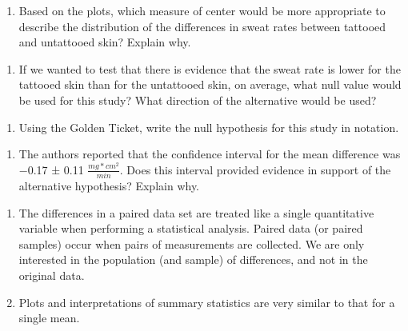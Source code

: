 \documentclass[
]{report}
\providecommand{\tightlist}{%
  \setlength{\itemsep}{0pt}\setlength{\parskip}{0pt}}
\begin{document}
\vspace{0.2in}

\begin{enumerate}
\def\labelenumi{\arabic{enumi}.}
\setcounter{enumi}{14}
\tightlist
\item
  Based on the plots, which measure of center would be more appropriate to describe the distribution of the differences in sweat rates between tattooed and untattooed skin? Explain why.
\end{enumerate}

\vspace{0.5in}

\begin{enumerate}
\def\labelenumi{\arabic{enumi}.}
\setcounter{enumi}{15}
\tightlist
\item
  If we wanted to test that there is evidence that the sweat rate is lower for the tattooed skin than for the untattooed skin, on average, what null value would be used for this study? What direction of the alternative would be used?
\end{enumerate}

\vspace{0.4in}

\begin{enumerate}
\def\labelenumi{\arabic{enumi}.}
\setcounter{enumi}{16}
\tightlist
\item
  Using the Golden Ticket, write the null hypothesis for this study in notation.
\end{enumerate}

\vspace{0.3in}

\begin{enumerate}
\def\labelenumi{\arabic{enumi}.}
\setcounter{enumi}{17}
\tightlist
\item
  The authors reported that the confidence interval for the mean difference was −0.17 ± 0.11 \(\frac{mg*cm^2}{min}\). Does this interval provided evidence in support of the alternative hypothesis? Explain why.
\end{enumerate}

\vspace{0.8in}

\begin{enumerate}
\def\labelenumi{\arabic{enumi}.}
\item
  The differences in a paired data set are treated like a single quantitative variable when performing a statistical analysis. Paired data (or paired samples) occur when pairs of measurements are collected. We are only interested in the population (and sample) of differences, and not in the original data.
\item
  Plots and interpretations of summary statistics are very similar to that for a single mean.
\end{enumerate}
\end{document}
